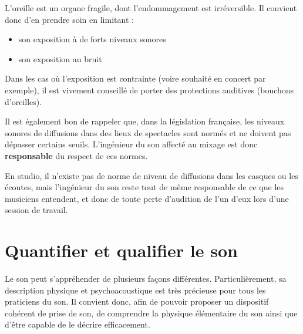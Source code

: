 \documentclass[
  letterpaper,
  DIV=11,
  numbers=noendperiod]{scrreprt}
\providecommand{\tightlist}{%
  \setlength{\itemsep}{0pt}\setlength{\parskip}{0pt}}\usepackage{longtable,booktabs,array}
\begin{document}
\begin{tcolorbox}[enhanced jigsaw, leftrule=.75mm, arc=.35mm, bottomtitle=1mm, colback=white, colbacktitle=quarto-callout-warning-color!10!white, opacityback=0, left=2mm, rightrule=.15mm, opacitybacktitle=0.6, breakable, toptitle=1mm, titlerule=0mm, bottomrule=.15mm, toprule=.15mm, coltitle=black, title=\textcolor{quarto-callout-warning-color}{\faExclamationTriangle}\hspace{0.5em}{Avertissement}]

L'oreille est un organe fragile, dont l'endommagement est irréversible.
Il convient donc d'en prendre soin en limitant :

\begin{itemize}
\tightlist
\item
  son exposition à de forts niveaux sonores
\item
  son exposition au bruit
\end{itemize}

Dans les cas où l'exposition est contrainte (voire souhaité en concert
par exemple), il est vivement conseillé de porter des protections
auditives (bouchons d'oreilles).

Il est également bon de rappeler que, dans la législation française, les
niveaux sonores de diffusions dans des lieux de spectacles sont normés
et ne doivent pas dépasser certains seuils. L'ingénieur du son affecté
au mixage est donc \textbf{responsable} du respect de ces normes.

En studio, il n'existe pas de norme de niveau de diffusions dans les
casques ou les écoutes, mais l'ingénieur du son reste tout de même
responsable de ce que les musiciens entendent, et donc de toute perte
d'audition de l'un d'eux lors d'une session de travail.

\end{tcolorbox}

\hypertarget{sec-son}{%
\chapter{Quantifier et qualifier le son}\label{sec-son}}

Le son peut s'appréhender de plusieurs façons différentes.
Particulièrement, sa description physique et psychoacoustique est très
précieuse pour tous les praticiens du son. Il convient donc, afin de
pouvoir proposer un dispositif cohérent de prise de son, de comprendre
la physique élémentaire du son ainsi que d'être capable de le décrire
efficacement.
\end{document}
